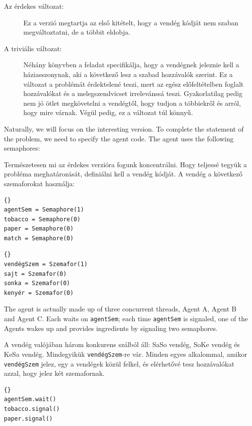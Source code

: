 \documentclass{book}
\begin{document}
\begin{description}
\item[Az érdekes változat:] Ez a verzió megtartja az első kitételt, hogy a vendég
kódját nem szaban megváltoztatni, de a többit eldobja.

\item[A triviális változat:] Néhány könyvben a feladat specifikálja, hogy a vendégnek
jeleznie kell a háziasszonynak, aki a következő lesz a szabad hozzávalók szerint.
Ez a változat a problémát érdektelené teszi, mert az egész előfeltételben foglalt
hozzávalókat és a melegszendvicset irrelevánssá teszi. Gyakorlatilag pedig nem jó ötlet megkövetelni a vendégtől,
hogy tudjon a többiekről és arról, hogy mire várnak. Végül pedig, ez a változat túl könnyű.

\end{description}

Naturally, we will focus on the interesting version.  To complete
the statement of the problem, we need to specify the agent code.
The agent uses the following semaphores:

Természetesen mi az érdekes verzióra fogunk koncentrálni. Hogy 
teljessé tegyük a probléma meghatározását, definiálni kell a vendég kódját.
A vendég a következő szemaforokat használja:

\begin{lstlisting}[title={Agent semaphores}]{}
agentSem = Semaphore(1)
tobacco = Semaphore(0)
paper = Semaphore(0)
match = Semaphore(0)
\end{lstlisting}

\begin{lstlisting}[title={A vendég szemaforai}]{}
vendégSzem = Szemafor(1)
sajt = Szemafor(0)
sonka = Szemafor(0)
kenyér = Szemafor(0)
\end{lstlisting}

The agent is actually made up of three concurrent
threads, Agent A, Agent B and Agent C.  Each waits on
{\tt agentSem}; each time {\tt agentSem} is signaled,
one of the Agents wakes up and provides ingredients by
signaling two semaphores.

A vendég valójában három konkurens szálból áll: SaSo vendég,
SoKe vendég és KeSa vendég. Mindegyikük {\tt vendégSzem}-re vár. Minden egyes
alkalommal, amikor {\tt vendégSzem} jelez, egy a vendégek közül felkel,
és elérhetővé tesz hozzávalókat azzal, hogy jelez
két szemafornak.

\begin{lstlisting}[title={Agent A code}]{}
agentSem.wait()
tobacco.signal()
paper.signal()
\end{lstlisting}
\end{document}
